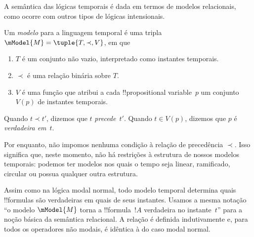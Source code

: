 \documentclass[../../../include/open-logic-section]{subfiles}
\begin{document}
A semântica das lógicas temporais é dada em termos de modelos relacionais, como ocorre com outros tipos de lógicas intensionais. 

\begin{defn}
  Um \emph{modelo} para a linguagem temporal é uma tripla
  $\mModel{M} = \tuple{T, \prec, V}$, em que
  \begin{enumerate}
  \item $T$ é um conjunto não vazio, interpretado como instantes temporais.
  \item $\prec$ é uma relação binária sobre $T$.
  \item $V$ é uma função que atribui a cada !!{propositional
    variable}~$p$ um conjunto $V(p)$ de instantes temporais.
  \end{enumerate}
  Quando $t \prec t'$, dizemos que $t$ \emph{precede}~$t'$. 
  Quando $t \in V(p)$, dizemos que $p$ é \emph{verdadeira em}~$t$.
\end{defn}

Por enquanto, não impomos nenhuma condição à relação de precedência $\prec$.
Isso significa que, neste momento, não há restrições à estrutura de nossos
modelos temporais: podemos ter modelos nos quais o tempo seja linear,
ramificado, circular ou possua qualquer outra estrutura. 

Assim como na lógica modal normal, todo modelo temporal determina quais
!!{formula}s são verdadeiras em quais de seus instantes. Usamos a mesma
notação ``o modelo $\mModel{M}$ torna a !!{formula}~$!A$ verdadeira no
instante~$t$'' para a noção básica da semântica relacional. A relação é
definida indutivamente e, para todos os operadores não modais, é idêntica
à do caso modal normal.
\end{document}
